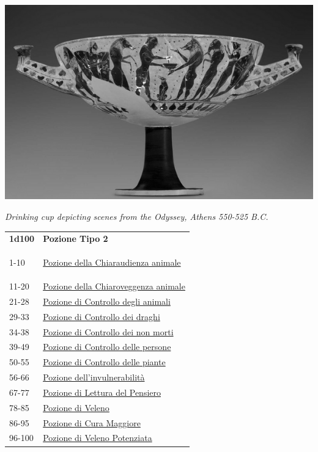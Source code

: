 \begin{multicols}{2}
{\begin{center}
\includegraphics[width=0.8\linewidth]{immagini/cupdrinking.png}

\emph{Drinking cup depicting scenes from the Odyssey, Athens 550-525 B.C.}
\end{center}


{\small\begin{tabular}{ll}
\textbf{1d100} & \textbf{Pozione Tipo 2}\\\hypertarget{Pozione Tipo 2}{}
1-10 & \hyperlink{PozionedellaChiaraudienzaanimale}{Pozione della Chiaraudienza animale}\\
11-20 & \hyperlink{PozionedellaChiaroveggenzaanimale}{Pozione della Chiaroveggenza animale}\\
21-28 & \hyperlink{PozionediControllodeglianimali}{Pozione di Controllo degli animali}\\
29-33 & \hyperlink{PozionediControllodeidraghi}{Pozione di Controllo dei draghi}\\
34-38 & \hyperlink{PozionediControllodeinonmorti}{Pozione di Controllo dei non morti}\\
39-49 & \hyperlink{PozionediControllodellepersone}{Pozione di Controllo delle persone}\\
50-55 & \hyperlink{PozionediControllodellepiante}{Pozione di Controllo delle piante}\\
56-66 & \hyperlink{Pozionedell'invulnerabilità}{Pozione dell'invulnerabilità}\\
67-77 & \hyperlink{PozionediLetturadelPensiero}{Pozione di Lettura del Pensiero}\\
78-85 & \hyperlink{PozionediVeleno}{Pozione di Veleno}\\
86-95 & \hyperlink{pozionifiltri}{Pozione di Cura Maggiore}\\
96-100 & \hyperlink{pozionifiltri}{Pozione di Veleno Potenziata}
\end{tabular}}

}
\end{multicols}
